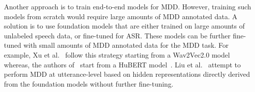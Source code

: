 Another approach is to train end-to-end models for MDD.
However, training such models from scratch would require large amounts of MDD annotated data.
A solution is to use foundation models that are either trained on large amounts of unlabeled speech data, or fine-tuned for ASR.
These models can be further fine-tuned with small amounts of MDD annotated data for the MDD task.
For example, Xu et al.~\cite{xu2021explore} follow this strategy starting from a Wav2Vec2.0 model~\cite{w2v2}
whereas, the authors of~\cite{ssl1, ssl2} start from a HuBERT model~\cite{hubert}.
Liu et al.~\cite{Liu2023ZeroShotAP} attempt to perform MDD at utterance-level based on hidden representations directly derived from the foundation models without further fine-tuning.



